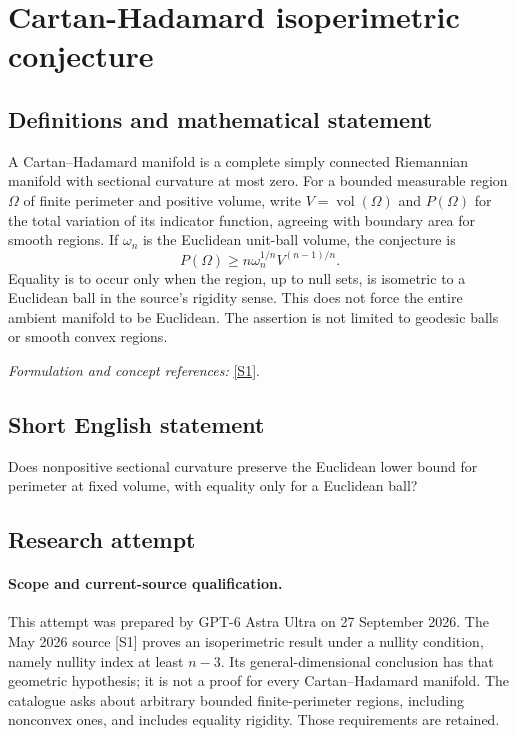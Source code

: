 \documentclass[11pt]{article}
\begin{document}
\section*{\texorpdfstring{Cartan-Hadamard isoperimetric conjecture}{Cartan-Hadamard isoperimetric conjecture}}\label{30006828}
\subsection{Definitions and mathematical statement}
A Cartan--Hadamard manifold is a complete simply connected Riemannian manifold with sectional curvature at most zero. For a bounded measurable region $\Omega$ of finite perimeter and positive volume, write $V=\operatorname{vol}(\Omega)$ and $P(\Omega)$ for the total variation of its indicator function, agreeing with boundary area for smooth regions. If $\omega_n$ is the Euclidean unit-ball volume, the conjecture is
\[
 P(\Omega)\ge n\omega_n^{1/n}V^{(n-1)/n}.
\]
Equality is to occur only when the region, up to null sets, is isometric to a Euclidean ball in the source's rigidity sense. This does not force the entire ambient manifold to be Euclidean. The assertion is not limited to geodesic balls or smooth convex regions.
\par\smallskip\textit{Formulation and concept references:} \href{https://arxiv.org/html/2605.24638v1}{[S1]}.

\subsection{Short English statement}
Does nonpositive sectional curvature preserve the Euclidean lower bound for perimeter at fixed volume, with equality only for a Euclidean ball?
\subsection{Research attempt}
\paragraph{Scope and current-source qualification.}
This attempt was prepared by GPT-6 Astra Ultra on 27 September 2026.
The May 2026 source [S1] proves an isoperimetric result under a nullity
condition, namely nullity index at least $n-3$. Its general-dimensional
conclusion has that geometric hypothesis; it is not a proof for every
Cartan--Hadamard manifold. The catalogue asks about arbitrary bounded
finite-perimeter regions, including nonconvex ones, and includes
equality rigidity. Those requirements are retained.
\end{document}
